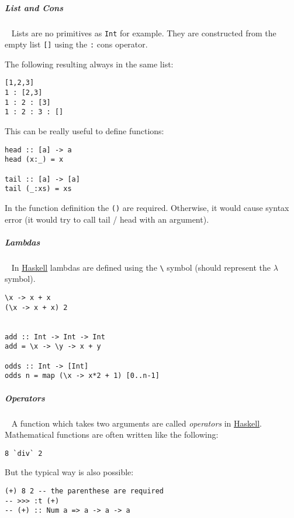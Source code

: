 \documentclass[11pt,twoside,landscape]{article}
\begin{document}
\begin{multicols}{3}
\subparagraph{List and Cons} \
\label{sec:org9bce8c6}
Lists are no primitives as \texttt{Int} for example.
They are constructed from the empty list \texttt{[]} using the \texttt{:} cons operator.

The following resulting always in the same list:


\lstset{language=haskell,label= ,caption= ,captionpos=b,numbers=none}
\begin{lstlisting}
[1,2,3]
1 : [2,3]
1 : 2 : [3]
1 : 2 : 3 : []
\end{lstlisting}

This can be really useful to define functions:

\lstset{language=haskell,label= ,caption= ,captionpos=b,numbers=none}
\begin{lstlisting}
head :: [a] -> a
head (x:_) = x

tail :: [a] -> [a]
tail (_:xs) = xs
\end{lstlisting}

In the function definition the \texttt{()} are required.
Otherwise, it would cause syntax error (it would try to call tail / head with an argument).

\subparagraph{Lambdas} \
\label{sec:org278f72f}
In \href{../../../roam/20210618182407-haskell.org}{Haskell} lambdas are defined using the \texttt{\textbackslash{}} symbol (should represent the \(\lambda\) symbol).

\lstset{language=haskell,label= ,caption= ,captionpos=b,numbers=none}
\begin{lstlisting}
\x -> x + x
(\x -> x + x) 2


add :: Int -> Int -> Int
add = \x -> \y -> x + y

odds :: Int -> [Int]
odds n = map (\x -> x*2 + 1) [0..n-1]
\end{lstlisting}

\subparagraph{Operators} \
\label{sec:org9384d9c}
A function which takes two arguments are called \emph{operators} in \href{../../../roam/20210618182407-haskell.org}{Haskell}.
Mathematical functions are often written like the following:

\lstset{language=haskell,label= ,caption= ,captionpos=b,numbers=none}
\begin{lstlisting}
8 `div` 2
\end{lstlisting}

But the typical way is also possible:

\lstset{language=haskell,label= ,caption= ,captionpos=b,numbers=none}
\begin{lstlisting}
(+) 8 2 -- the parenthese are required
-- >>> :t (+)
-- (+) :: Num a => a -> a -> a


\end{lstlisting}
\end{multicols}
\end{document}
